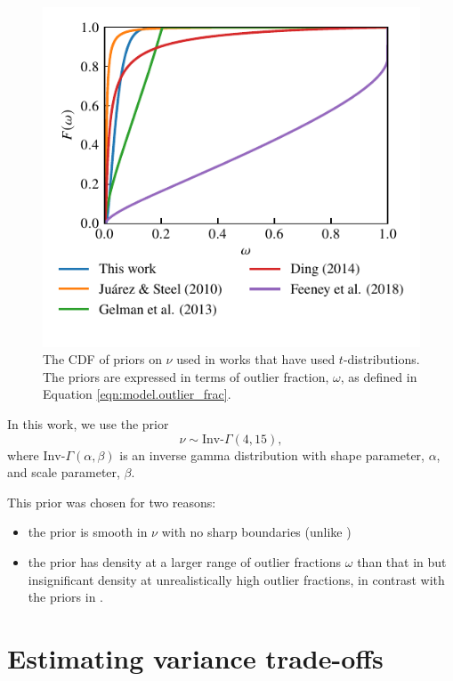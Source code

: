 \documentclass[fleqn,usenatbib]{rasti}
\begin{document}
\begin{figure}
	\includegraphics[width=\columnwidth]{graphics/cdf_outlier_frac}
    \caption{The CDF of priors on $\nu$ used in works that have used
    $t$-distributions. The priors are expressed in terms of outlier fraction,
    $\omega$, as defined in Equation \ref{eqn:model.outlier_frac}.}
    \label{fig:priors.outlier_frac}
\end{figure}

In this work, we use the prior
\begin{equation}
    \nu \sim \text{Inv-}\Gamma(4, 15),
\end{equation}
where $\text{Inv-}\Gamma(\alpha, \beta)$ is an inverse gamma distribution with
shape parameter, $\alpha$, and scale parameter, $\beta$.

This prior was chosen for two reasons:
\begin{itemize}
    \item the prior is smooth in $\nu$ with no sharp boundaries (unlike
          \citet{Gelman:2013})
    \item the prior has density at a larger range of outlier fractions $\omega$
          than that in \citet{Juarez:2010} but insignificant density
          at unrealistically high outlier fractions, in contrast with the priors
          in \citet{Ding:2014, Feeney:2018}.
\end{itemize}

\section{Estimating variance trade-offs}
\label{sec:fisher}
\end{document}
